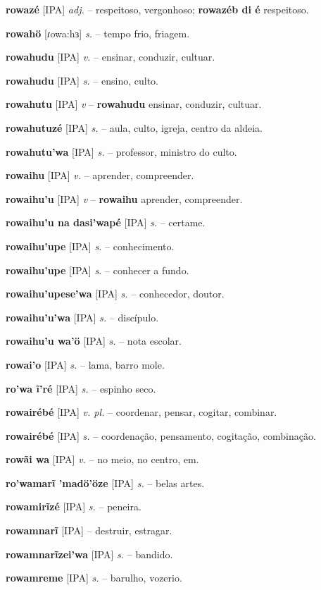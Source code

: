 \textbf{rowazé} [IPA] \textit{adj.} -- respeitoso, vergonhoso; \textbf{rowazéb di é} respeitoso.

\textbf{rowahö} [ɾowa:hɜ] \textit{s.} -- tempo frio, friagem.

\textbf{rowahudu} [IPA] \textit{v.} -- ensinar, conduzir, cultuar.

\textbf{rowahudu} [IPA] \textit{s.} -- ensino, culto.

\textbf{rowahutu} [IPA] \textit{v} -- \textbf{rowahudu} ensinar, conduzir, cultuar.

\textbf{rowahutuzé} [IPA] \textit{s.} -- aula, culto, igreja, centro da aldeia.

\textbf{rowahutu'wa} [IPA] \textit{s.} -- professor, ministro do culto.

\textbf{rowaihu} [IPA] \textit{v.} -- aprender, compreender.

\textbf{rowaihu'u} [IPA] \textit{v} -- \textbf{rowaihu} aprender, compreender.

\textbf{rowaihu'u na dasi'wapé} [IPA] \textit{s.} -- certame.

\textbf{rowaihu'upe} [IPA] \textit{s.} -- conhecimento.

\textbf{rowaihu'upe} [IPA] \textit{s.} -- conhecer a fundo.

\textbf{rowaihu'upese'wa} [IPA] \textit{s.} -- conhecedor, doutor.

\textbf{rowaihu'u'wa} [IPA] \textit{s.} -- discípulo.

\textbf{rowaihu'u wa'ö} [IPA] \textit{s.} -- nota escolar.

\textbf{rowai'o} [IPA] \textit{s.} -- lama, barro mole.

\textbf{ro'wa ĩ'ré} [IPA] \textit{s.} -- espinho seco.

\textbf{rowairébé} [IPA] \textit{v. pl.} -- coordenar, pensar, cogitar, combinar.

\textbf{rowairébé} [IPA] \textit{s.} -- coordenação, pensamento, cogitação, combinação.

\textbf{rowãi wa} [IPA] \textit{v.} -- no meio, no centro, em.

\textbf{ro'wamarĩ 'madö'öze} [IPA] \textit{s.} -- belas artes.

\textbf{rowamirĩzé} [IPA] \textit{s.} -- peneira.

\textbf{rowamnarĩ} [IPA] \textit{} -- destruir, estragar.

\textbf{rowamnarĩzei'wa} [IPA] \textit{s.} -- bandido.

\textbf{rowamreme} [IPA] \textit{s.} -- barulho, vozerio.

